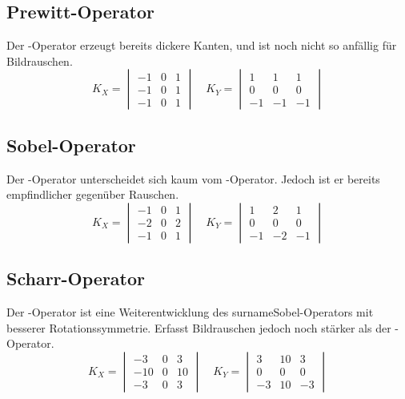 \subsection*{Prewitt-Operator}
Der -Operator \cite[S.~108]{prewitt1070} erzeugt bereits dickere Kanten, und ist noch nicht so anfällig für Bildrauschen.
\begin{equation}
  K_X = \begin{vmatrix}
    -1 & 0 & 1 \\
    -1 & 0 & 1 \\
    -1 & 0 & 1
  \end{vmatrix}
  \quad
  K_Y = \begin{vmatrix}
     1 &  1 &  1 \\
     0 &  0 &  0 \\
    -1 & -1 & -1
  \end{vmatrix}
\end{equation}

\subsection*{Sobel-Operator}
Der -Operator \cite[Kap.~5.2]{davies2012} unterscheidet sich kaum vom -Operator.
Jedoch ist er bereits empfindlicher gegenüber Rauschen.
\begin{equation}
  K_X = \begin{vmatrix}
    -1 & 0 & 1 \\
    -2 & 0 & 2 \\
    -1 & 0 & 1
  \end{vmatrix}
  \quad
  K_Y = \begin{vmatrix}
     1 &  2 &  1 \\
     0 &  0 &  0 \\
    -1 & -2 & -1
  \end{vmatrix}
\end{equation}

\subsection*{Scharr-Operator}
Der -Operator \cite[Kap.~9.3]{scharr2000} ist eine Weiterentwicklung des surname{Sobel}-Operators mit besserer Rotationssymmetrie.
Erfasst Bildrauschen jedoch noch stärker als der -Operator.
\begin{equation}
  K_X = \begin{vmatrix}
     -3 & 0 &  3 \\
    -10 & 0 & 10 \\
     -3 & 0 &  3
  \end{vmatrix}
  \quad
  K_Y = \begin{vmatrix}
     3 & 10 &  3 \\
     0 &  0 &  0 \\
    -3 & 10 & -3
  \end{vmatrix}
\end{equation}


